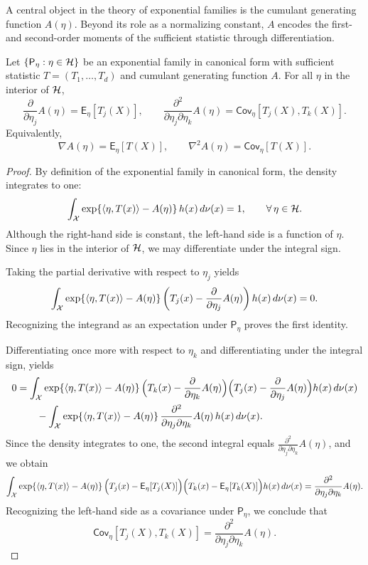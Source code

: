 A central object in the theory of exponential families is the cumulant generating
function \(A(\eta)\). Beyond its role as a normalizing constant, \(A\) encodes the
first- and second-order moments of the sufficient statistic through
differentiation.

\begin{corollary}
\label{cor:cgt}
Let \(\{ \mathsf{P}_\eta : \eta \in \mathcal{H} \}\) be an exponential family in canonical
form with sufficient statistic
\(
T = (T_1,\dots,T_d)
\)
and cumulant generating function \(A\).
For all \(\eta\) in the interior of \(\mathcal{H}\),
\[
\frac{\partial}{\partial \eta_j} A(\eta)
= \mathsf{E}_\eta\!\left[T_j(X)\right],
\qquad
\frac{\partial^2}{\partial \eta_j \partial \eta_k} A(\eta)
= \mathsf{Cov}_\eta\!\left[T_j(X),T_k(X)\right].
\]
Equivalently,
\[
\nabla A(\eta) = \mathsf{E}_\eta[T(X)],
\qquad
\nabla^2 A(\eta) = \mathsf{Cov}_\eta[T(X)].
\]
\end{corollary}

\begin{proof}
By definition of the exponential family in canonical form, the density integrates
to one:
\[
\int_{\mathcal{X}}
\exp\!\left\{
\langle \eta, T(x) \rangle - A(\eta)
\right\}
h(x)\, d\nu(x)
= 1,
\qquad \forall\, \eta \in \mathcal{H}.
\]
Although the right-hand side is constant, the left-hand side is a function of
\(\eta\). Since \(\eta\) lies in the interior of \(\mathcal{H}\), we may differentiate
under the integral sign.

Taking the partial derivative with respect to \(\eta_j\) yields
\[
\int_{\mathcal{X}}
\exp\!\left\{
\langle \eta, T(x) \rangle - A(\eta)
\right\}
\left(
T_j(x) - \frac{\partial}{\partial \eta_j} A(\eta)
\right)
h(x)\, d\nu(x)
= 0.
\]
Recognizing the integrand as an expectation under \(\mathsf{P}_\eta\) proves the
first identity.



Differentiating once more with respect to \(\eta_k\) 
and differentiating under the
integral sign, yields
\begin{align*}
0
&=
\int_{\mathcal{X}}
\exp\!\left\{
\langle \eta, T(x) \rangle - A(\eta)
\right\}
\Bigl(
T_k(x) - \frac{\partial}{\partial \eta_k} A(\eta)
\Bigr)
\Bigl(
T_j(x) - \frac{\partial}{\partial \eta_j} A(\eta)
\Bigr)
h(x)\, d\nu(x)
\\
&\qquad
-
\int_{\mathcal{X}}
\exp\!\left\{
\langle \eta, T(x) \rangle - A(\eta)
\right\}
\frac{\partial^2}{\partial \eta_j \partial \eta_k} A(\eta)
\, h(x)\, d\nu(x).
\end{align*}
Since the density integrates to one, the second integral equals
\(\frac{\partial^2}{\partial \eta_j \partial \eta_k} A(\eta)\), and we obtain
\[
\int_{\mathcal{X}}
\exp\!\left\{
\langle \eta, T(x) \rangle - A(\eta)
\right\}
\Bigl(
T_j(x) - \mathsf{E}_\eta[T_j(X)]
\Bigr)
\Bigl(
T_k(x) - \mathsf{E}_\eta[T_k(X)]
\Bigr)
h(x)\, d\nu(x)
=
\frac{\partial^2}{\partial \eta_j \partial \eta_k} A(\eta).
\]
Recognizing the left-hand side as a covariance under \(\mathsf{P}_\eta\), we
conclude that
\[
\mathsf{Cov}_\eta\!\left[T_j(X),T_k(X)\right]
=
\frac{\partial^2}{\partial \eta_j \partial \eta_k} A(\eta).
\]

\end{proof}

